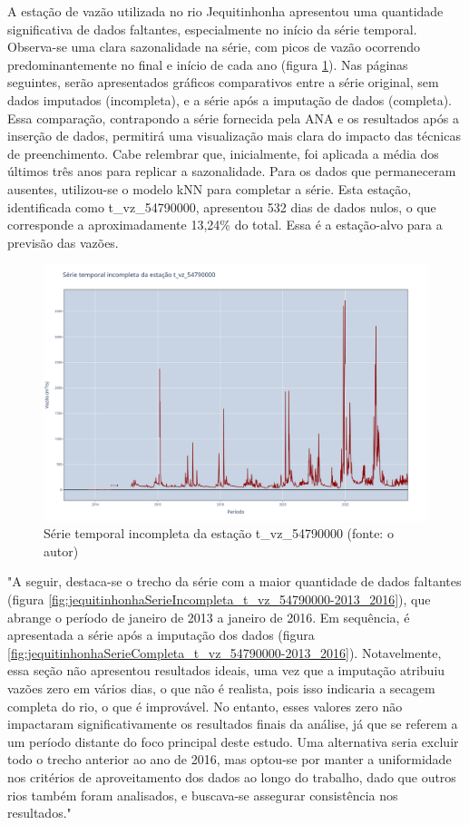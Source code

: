 A estação de vazão utilizada no rio Jequitinhonha apresentou uma quantidade significativa de dados faltantes, especialmente no início da série temporal. Observa-se uma clara sazonalidade na série, com picos de vazão ocorrendo predominantemente no final e início de cada ano (figura \ref{fig:jequitinhonhaSerieIncompleta_t_vz_54790000}). Nas páginas seguintes, serão apresentados gráficos comparativos entre a série original, sem dados imputados (incompleta), e a série após a imputação de dados (completa). Essa comparação, contrapondo a série fornecida pela ANA e os resultados após a inserção de dados, permitirá uma visualização mais clara do impacto das técnicas de preenchimento. Cabe relembrar que, inicialmente, foi aplicada a média dos últimos três anos para replicar a sazonalidade. Para os dados que permaneceram ausentes, utilizou-se o modelo kNN para completar a série. Esta estação, identificada como t\_vz\_54790000, apresentou 532 dias de dados nulos, o que corresponde a aproximadamente 13,24\% do total. Essa é a estação-alvo para a previsão das vazões.

\begin{figure}[!h]
\centering
\includegraphics[scale=0.25]{Figuras/jequiti/jequitinhonhaSerieIncompleta_t_vz_54790000.png}
\caption{Série temporal incompleta da estação t\_vz\_54790000 (fonte: o autor)}
\label{fig:jequitinhonhaSerieIncompleta_t_vz_54790000}
\end{figure}

"A seguir, destaca-se o trecho da série com a maior quantidade de dados faltantes (figura \ref{fig:jequitinhonhaSerieIncompleta_t_vz_54790000-2013_2016}), que abrange o período de janeiro de 2013 a janeiro de 2016. Em sequência, é apresentada a série após a imputação dos dados (figura \ref{fig:jequitinhonhaSerieCompleta_t_vz_54790000-2013_2016}). Notavelmente, essa seção não apresentou resultados ideais, uma vez que a imputação atribuiu vazões zero em vários dias, o que não é realista, pois isso indicaria a secagem completa do rio, o que é improvável. No entanto, esses valores zero não impactaram significativamente os resultados finais da análise, já que se referem a um período distante do foco principal deste estudo. Uma alternativa seria excluir todo o trecho anterior ao ano de 2016, mas optou-se por manter a uniformidade nos critérios de aproveitamento dos dados ao longo do trabalho, dado que outros rios também foram analisados, e buscava-se assegurar consistência nos resultados."

